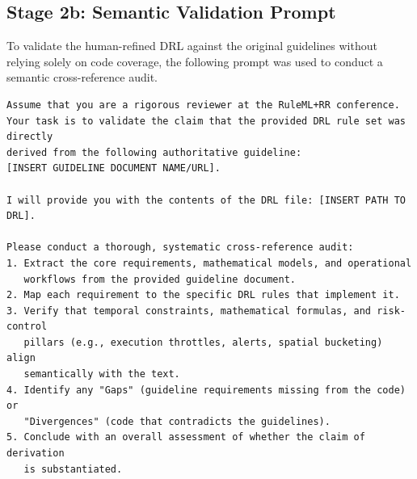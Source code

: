 \documentclass{article}
\begin{document}
\subsection{Stage 2b: Semantic Validation Prompt}
To validate the human-refined DRL against the original guidelines without relying solely on code coverage, the following prompt was used to conduct a semantic cross-reference audit.

\begin{verbatim}
Assume that you are a rigorous reviewer at the RuleML+RR conference. 
Your task is to validate the claim that the provided DRL rule set was directly 
derived from the following authoritative guideline: 
[INSERT GUIDELINE DOCUMENT NAME/URL].

I will provide you with the contents of the DRL file: [INSERT PATH TO DRL].

Please conduct a thorough, systematic cross-reference audit:
1. Extract the core requirements, mathematical models, and operational 
   workflows from the provided guideline document.
2. Map each requirement to the specific DRL rules that implement it.
3. Verify that temporal constraints, mathematical formulas, and risk-control 
   pillars (e.g., execution throttles, alerts, spatial bucketing) align 
   semantically with the text.
4. Identify any "Gaps" (guideline requirements missing from the code) or 
   "Divergences" (code that contradicts the guidelines).
5. Conclude with an overall assessment of whether the claim of derivation 
   is substantiated.
\end{verbatim}
\end{document}
